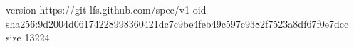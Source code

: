 version https://git-lfs.github.com/spec/v1
oid sha256:9d2004d06174228998360421dc7c9be4feb49c597c9382f7523a8df67f0e7dcc
size 13224
